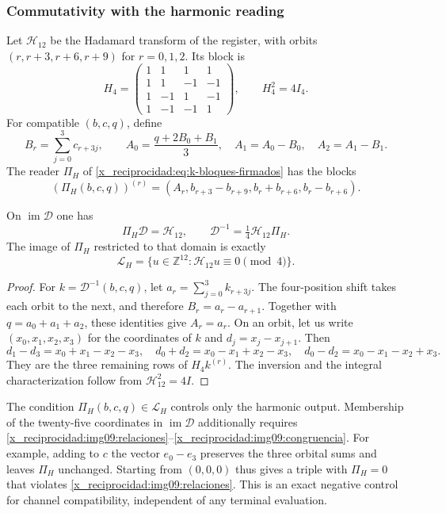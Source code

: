 \subsubsection{Commutativity with the harmonic reading}

Let $\mathcal H_{12}$ be the Hadamard transform of the register, with orbits $(r,r+3,r+6,r+9)$ for $r=0,1,2$. Its block is
\[
 H_4=\begin{pmatrix}
 1&1&1&1\\1&1&-1&-1\\1&-1&1&-1\\1&-1&-1&1
 \end{pmatrix},\qquad H_4^2=4I_4.
\]
For compatible $(b,c,q)$, define
\[
 B_r=\sum_{j=0}^3c_{r+3j},\qquad
 A_0=\frac{q+2B_0+B_1}{3},\quad A_1=A_0-B_0,
 \quad A_2=A_1-B_1.
\]
The reader $\Pi_H$ of \eqref{x_reciprocidad:eq:k-bloques-firmados} has the blocks
\[
 (\Pi_H(b,c,q))^{(r)}=
 (A_r,b_{r+3}-b_{r+9},b_r+b_{r+6},b_r-b_{r+6}).
\]

\begin{proposition}
\label{x_reciprocidad:img09:triangulo}
On $\operatorname{im}\mathcal D$ one has
\[
 \Pi_H\mathcal D=\mathcal H_{12},\qquad
 \mathcal D^{-1}=\tfrac14\mathcal H_{12}\Pi_H.
\]
The image of $\Pi_H$ restricted to that domain is exactly
\[
 \mathcal L_H=
 \{u\in\mathbb Z^{12}:\mathcal H_{12}u\equiv0\pmod4\}.
\]
\end{proposition}
\begin{proof}
For $k=\mathcal D^{-1}(b,c,q)$, let $a_r=\sum_{j=0}^3k_{r+3j}$. The four-position shift takes each orbit to the next, and therefore $B_r=a_r-a_{r+1}$. Together with $q=a_0+a_1+a_2$, these identities give $A_r=a_r$. On an orbit, let us write $(x_0,x_1,x_2,x_3)$ for the coordinates of $k$ and $d_j=x_j-x_{j+1}$. Then
\[
 d_1-d_3=x_0+x_1-x_2-x_3,\quad
 d_0+d_2=x_0-x_1+x_2-x_3,\quad
 d_0-d_2=x_0-x_1-x_2+x_3.
\]
They are the three remaining rows of $H_4k^{(r)}$. The inversion and the integral characterization follow from $\mathcal H_{12}^2=4I$.
\end{proof}

The condition $\Pi_H(b,c,q)\in\mathcal L_H$ controls only the
harmonic output. Membership of the twenty-five coordinates in
$\operatorname{im}\mathcal D$ additionally requires
\eqref{x_reciprocidad:img09:relaciones}--\eqref{x_reciprocidad:img09:congruencia}.
For example, adding to $c$ the vector $e_0-e_3$ preserves the three orbital
sums and leaves $\Pi_H$ unchanged. Starting from $(0,0,0)$ thus
gives a triple with $\Pi_H=0$ that violates
\eqref{x_reciprocidad:img09:relaciones}. This is an exact negative control for
channel compatibility, independent of any terminal evaluation.

